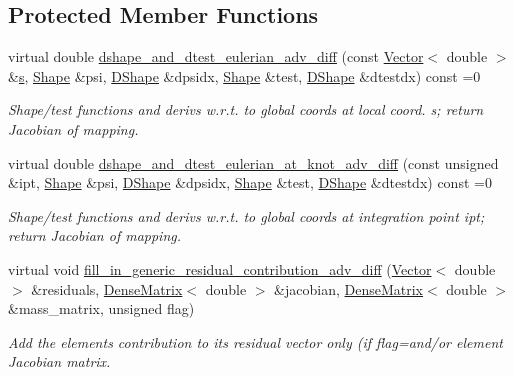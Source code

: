 \subsection*{Protected Member Functions}
\begin{DoxyCompactItemize}
\item 
virtual double \hyperlink{classoomph_1_1SteadyAxisymAdvectionDiffusionEquations_a0c28aea2e5996566b1a9bf2db033aa49}{dshape\+\_\+and\+\_\+dtest\+\_\+eulerian\+\_\+adv\+\_\+diff} (const \hyperlink{classoomph_1_1Vector}{Vector}$<$ double $>$ \&\hyperlink{cfortran_8h_ab7123126e4885ef647dd9c6e3807a21c}{s}, \hyperlink{classoomph_1_1Shape}{Shape} \&psi, \hyperlink{classoomph_1_1DShape}{D\+Shape} \&dpsidx, \hyperlink{classoomph_1_1Shape}{Shape} \&test, \hyperlink{classoomph_1_1DShape}{D\+Shape} \&dtestdx) const =0
\begin{DoxyCompactList}\small\item\em Shape/test functions and derivs w.\+r.\+t. to global coords at local coord. s; return Jacobian of mapping. \end{DoxyCompactList}\item 
virtual double \hyperlink{classoomph_1_1SteadyAxisymAdvectionDiffusionEquations_a169cdaf88ac3dae29c77fba726346a0c}{dshape\+\_\+and\+\_\+dtest\+\_\+eulerian\+\_\+at\+\_\+knot\+\_\+adv\+\_\+diff} (const unsigned \&ipt, \hyperlink{classoomph_1_1Shape}{Shape} \&psi, \hyperlink{classoomph_1_1DShape}{D\+Shape} \&dpsidx, \hyperlink{classoomph_1_1Shape}{Shape} \&test, \hyperlink{classoomph_1_1DShape}{D\+Shape} \&dtestdx) const =0
\begin{DoxyCompactList}\small\item\em Shape/test functions and derivs w.\+r.\+t. to global coords at integration point ipt; return Jacobian of mapping. \end{DoxyCompactList}\item 
virtual void \hyperlink{classoomph_1_1SteadyAxisymAdvectionDiffusionEquations_aa284f6d5072e793b2f363241d9d2c3ba}{fill\+\_\+in\+\_\+generic\+\_\+residual\+\_\+contribution\+\_\+adv\+\_\+diff} (\hyperlink{classoomph_1_1Vector}{Vector}$<$ double $>$ \&residuals, \hyperlink{classoomph_1_1DenseMatrix}{Dense\+Matrix}$<$ double $>$ \&jacobian, \hyperlink{classoomph_1_1DenseMatrix}{Dense\+Matrix}$<$ double $>$ \&mass\+\_\+matrix, unsigned flag)
\begin{DoxyCompactList}\small\item\em Add the element\textquotesingle{}s contribution to its residual vector only (if flag=and/or element Jacobian matrix. \end{DoxyCompactList}\end{DoxyCompactItemize}
